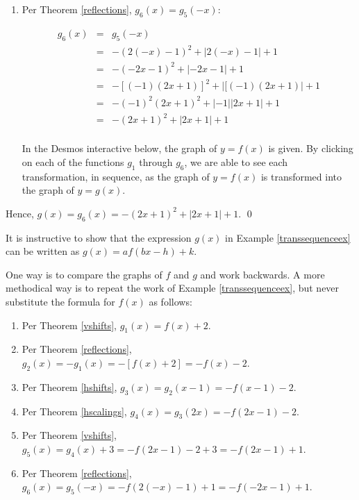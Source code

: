 \documentclass{ximera}
\begin{document}
\begin{example}
\begin{enumerate}
\item  Per Theorem \ref{reflections}, $g_{6}(x) = g_{5}(-x)$:

\[ \begin{array}{rcl}

g_{6}(x) & = & g_{5}(-x) \\
 &  = &  -(2(-x)-1)^2+|2(-x)-1|+1 \\
  &  = & -(-2x-1)^2+|-2x-1|+1 \\
  &  = &  -[(-1)(2x+1)]^2+|[(-1)(2x+1)|+1 \\
  &  = &   -(-1)^2(2x+1)^2+|-1||2x+1| + 1 \\
  & =  & -(2x+1)^2+|2x+1|+1 \\
  
  \end{array} \]

  In the Desmos interactive below, the graph of $y=f(x)$ is given.  By clicking on each of the functions $g_{1}$ through $g_{6}$, we are able to see each transformation, in sequence, as the graph of $y=f(x)$ is transformed into the graph of $y = g(x)$.

\begin{center}
\end{center} 

\end{enumerate}

Hence, $g(x) = g_{6}(x) = -(2x+1)^2+|2x+1| + 1$.  \qed
 
\end{example}

It is instructive to show that the expression $g(x)$ in Example \ref{transsequenceex}  can be written as $g(x) = a f(bx-h)+k$.  

\smallskip

One way is to compare the graphs of $f$ and $g$ and work backwards.  A more methodical way is to repeat the work of Example \ref{transsequenceex}, but never substitute the formula for $f(x)$ as follows:


\begin{enumerate}

\item  Per Theorem \ref{vshifts}, $g_{1}(x) = f(x) + 2$.

\item  Per Theorem \ref{reflections}, $g_{2}(x) = -g_{1}(x) =  -[f(x) + 2] = -f(x)-2$.

\item  Per Theorem \ref{hshifts}, $g_{3}(x) = g_{2}(x-1) = -f(x-1)-2$.

\item  Per Theorem \ref{hscalings}, $g_{4}(x) = g_{3}(2x) =-f(2x-1)-2$.

\item  Per Theorem \ref{vshifts}, $g_{5}(x) = g_{4}(x)+3 = -f(2x-1)-2 + 3 = -f(2x-1)+1$.

\item  Per Theorem \ref{reflections}, $g_{6}(x) = g_{5}(-x) =  -f(2(-x)-1)+1 = -f(-2x-1)+1$.

\end{enumerate}
\end{document}

